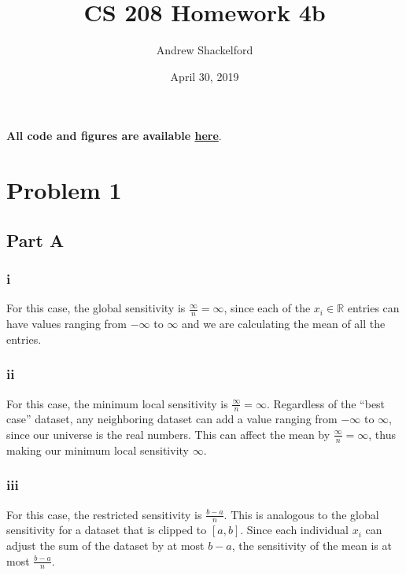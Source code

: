 \documentclass[12pt]{article}
\title{CS 208 Homework 4b}
\author{Andrew Shackelford}
\date{April 30, 2019}
\begin{document}
\maketitle

\textbf{All code and figures are available \href{https://github.com/andrew-shackelford/cs208/tree/master/4b}{here}}.

{
  \hypersetup{linkcolor=black, hidelinks}
  \tableofcontents
}

\newpage

\section{Problem 1}

\subsection{Part A}

\subsubsection{i}

\noindent

For this case, the global sensitivity is $\frac{\infty}{n} = \infty$, since each of the $x_i \in \mathbb{R}$ entries can have values ranging from $-\infty$ to $\infty$ and we are calculating the mean of all the entries.

\subsubsection{ii}

\noindent

For this case, the minimum local sensitivity is $\frac{\infty}{n} = \infty$. Regardless of the ``best case'' dataset, any neighboring dataset can add a value ranging from $-\infty$ to $\infty$, since our universe is the real numbers. This can affect the mean by $\frac{\infty}{n} = \infty$, thus making our minimum local sensitivity $\infty$.

\subsubsection{iii}

\noindent

For this case, the restricted sensitivity is $\frac{b-a}{n}$. This is analogous to the global sensitivity for a dataset that is clipped to $[a, b]$. Since each individual $x_i$ can adjust the sum of the dataset by at most $b-a$, the sensitivity of the mean is at most $\frac{b-a}{n}$.
\end{document}
